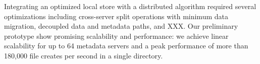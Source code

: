 Integrating an optimized local store with a distributed algorithm required
several optimizations including cross-server split operations with minimum data
migration, decoupled data and metadata paths, and XXX.
Our preliminary prototype show promising scalability and performance: we
achieve linear scalability for up to 64 metadata servers and a peak performance
of more than 180,000 file creates per second in a single directory.


